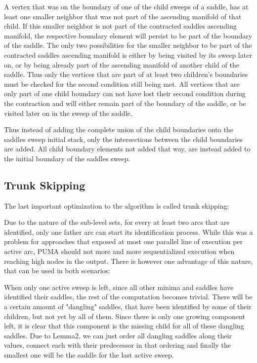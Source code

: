 \documentclass{scrartcl}
\begin{document}
A vertex that was on the boundary of one of the child sweeps of a saddle, has at least one smaller neighbor that was not part of the ascending manifold of that child. If this smaller neighbor is not part of the contracted saddles ascending manifold, the respective boundary element will persist to be part of the boundary of the saddle. The only two possibilities for the smaller neighbor to be part of the contracted saddles ascending manifold is either by being visited by its sweep later on, or by being already part of the ascending manifold of another child of the saddle. Thus only the vertices that are part of at least two children's boundaries must be checked for the second condition still being met. All vertices that are only part of one child boundary can not have lost their second condition during the contraction and will either remain part of the boundary of the saddle, or be visited later on in the sweep of the saddle.  

Thus instead of adding the complete union of the child boundaries onto the saddles sweep initial stack, only the intersections between the child boundaries are added. All child boundary elements not added that way, are instead added to the initial boundary of the saddles sweep.

\subsection{Trunk Skipping}
The last important optimization to the algorithm is called trunk skipping:

Due to the nature of the sub-level sets, for every at least two arcs that are identified, only one father arc can start its identification process. While this was a problem for approaches that exposed at most one parallel line of execution per active arc, PUMA should not  more and more sequentialized execution when reaching high nodes in the output. There is however one advantage of this nature, that can be used in both scenarios:

When only one active sweep is left, since all other minima and saddles have identified their saddles, the rest of the computation becomes trivial. There will be a certain amount of "dangling" saddles, that have been identified by some of their children, but not yet by all of them. Since there is only one growing component left, it is clear that this component is the missing child for all of these dangling saddles. Due to Lemma2, we can just order all dangling saddles along their values, connect each with their predecessor in that ordering and finally the smallest one will be the saddle for the last active sweep. 
\end{document}
